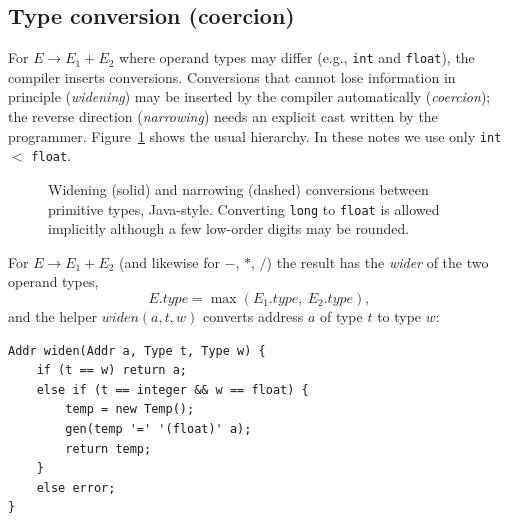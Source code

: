\documentclass[11pt,a4paper]{article}
\newcommand{\at}[2]{\ensuremath{#1.\mathit{#2}}}
\begin{document}
\subsection{Type conversion (coercion)}
For $E \to E_1 + E_2$ where operand types may differ (e.g., \texttt{int} and \texttt{float}), the compiler inserts conversions. Conversions that cannot lose information in principle (\emph{widening}) may be inserted by the compiler automatically (\emph{coercion}); the reverse direction (\emph{narrowing}) needs an explicit cast written by the programmer. Figure~\ref{fig:typehier} shows the usual hierarchy. In these notes we use only \texttt{int} $<$ \texttt{float}.
\begin{figure}[H]
\centering
{}
\caption{Widening (solid) and narrowing (dashed) conversions between primitive types, Java-style. Converting \texttt{long} to \texttt{float} is allowed implicitly although a few low-order digits may be rounded.}
\label{fig:typehier}
\end{figure}
For $E \to E_1 + E_2$ (and likewise for $-$, $*$, $/$) the result has the \emph{wider} of the two operand types,
\[
\at{E}{type} = \max(\at{E_1}{type},\ \at{E_2}{type}),
\]
and the helper $\mathit{widen}(a, t, w)$ converts address $a$ of type $t$ to type $w$:

\begin{lstlisting}
Addr widen(Addr a, Type t, Type w) {
    if (t == w) return a;
    else if (t == integer && w == float) {
        temp = new Temp();
        gen(temp '=' '(float)' a);
        return temp;
    }
    else error;
}
\end{lstlisting}
\end{document}
